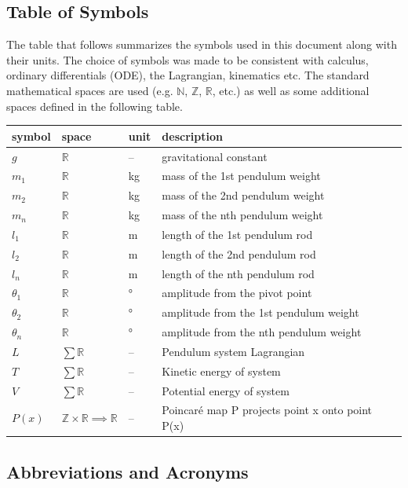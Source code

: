 \documentclass[12pt]{article}
\begin{document}
\subsection{Table of Symbols}

The table that follows summarizes the symbols used in this document along with
their units. The choice of symbols was made to be consistent with calculus,
ordinary
differentials (ODE), the Lagrangian, kinematics etc. The standard mathematical
spaces
are used (e.g. $\mathbb{N}$, $\mathbb{Z}$, $\mathbb{R}$, etc.) as well as some 
additional spaces defined in the following table. 
~\newline
\renewcommand{\arraystretch}{1.2}
\noindent \begin{longtable*}{l l l p{8cm}} \toprule
\textbf{symbol} & \textbf{space} & \textbf{unit} & \textbf{description}\\
\midrule 
$g$ & $\mathbb{R}$ & -- & gravitational constant
\\
$m_1$ & $\mathbb{R}$ & kg & mass of the 1st pendulum weight
\\ 
$m_2$ & $\mathbb{R}$ & kg & mass of the 2nd pendulum weight
\\ 
$m_n$ & $\mathbb{R}$ & kg & mass of the nth pendulum weight
\\ 
$l_1$ & $\mathbb{R}$ & m & length of the 1st pendulum rod
\\ 
$l_2$ & $\mathbb{R}$ & m & length of the 2nd pendulum rod
\\ 
$l_n$ & $\mathbb{R}$ & m & length of the nth pendulum rod
\\
$\theta_1$ & $\mathbb{R}$ & \si{\degree} & amplitude from the pivot point
\\
$\theta_2$ & $\mathbb{R}$ & \si{\degree}  & amplitude from the 1st pendulum weight
\\
$\theta_n$ & $\mathbb{R}$ & \si{\degree}  & amplitude from the nth pendulum weight
\\
$L$ & $\sum\mathbb{R}$ & -- & Pendulum system Lagrangian
\\
$T$ & $\sum\mathbb{R}$ & -- & Kinetic energy of system
\\
$V$ & $\sum\mathbb{R}$ & -- & Potential energy of system
\\
$P(x)$ & $\mathbb{Z} \times \mathbb{R} \implies \mathbb{R}$ & -- & Poincaré map P projects point x onto point P(x)
\\
\bottomrule
\end{longtable*}

\newpage
\subsection{Abbreviations and Acronyms}
\end{document}

